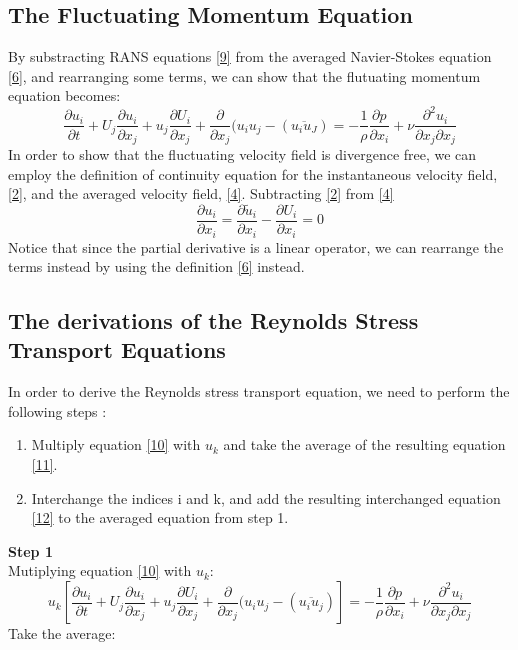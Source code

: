 \documentclass[11pt]{article}
\begin{document}
{%
\subsection{The Fluctuating Momentum Equation}

By substracting RANS equations \eqref{9} from the averaged Navier-Stokes equation
\eqref{6}, and rearranging some terms, we can show that the flutuating momentum
equation becomes: 
\begin{equation}
\label{10}
\frac{\partial u_{i}}{\partial t}+U_{j}\frac{\partial u_{i}}{\partial x_{j}}+u_{j}\frac{\partial U_{i}}{\partial x_{j}}+\frac{\partial}{\partial x_{j}}(u_{i}u_{j}-(\overline{u_{i}u_{J}})
=-\frac{1}{\rho}\frac{\partial p}{\partial x_{i}}+\nu\frac{\partial^{2}u_{i}}{\partial x_{j}\partial x_{j}}
\end{equation}
In order to show that the fluctuating velocity field is divergence free,
we can employ the definition of continuity equation for the instantaneous
velocity field, \eqref{2}, and the averaged velocity field, \eqref{4}. Subtracting
\eqref{2} from \eqref{4}
\begin{equation}
\label{11}
\frac{\partial u_{i}}{\partial x_{i}}=\frac{\partial\tilde{u}_{i}}{\partial x_{i}}-\frac{\partial U_{i}}{\partial x_{i}}=0
\end{equation}
Notice that since the partial derivative is a linear operator, we can rearrange 
the terms instead by using the definition \eqref{6} instead.


\subsection{The derivations of the Reynolds Stress Transport Equations}

In order to derive the Reynolds stress transport equation, we need
to perform the following steps :
\begin{enumerate}
\item Multiply equation \eqref{10} with $u_k$ and take the average of the resulting
equation \eqref{11}.
\item Interchange the indices i and k, and add the resulting interchanged
equation \eqref{12} to the averaged equation from step 1.
\end{enumerate}

\vspace{5mm}\hspace{-5mm}\textbf{Step 1} \\
Mutiplying equation \eqref{10} with $u_{k}$:
\[
u_{k}\left[\frac{\partial u_{i}}{\partial t}+U_{j}\frac{\partial u_{i}}{\partial x_{j}}+u_{j}\frac{\partial U_{i}}{\partial x_{j}}+\frac{\partial}{\partial x_{j}}(u_{i}u_{j}-(\overline{u_{i}u_{j}})\right]
=-\frac{1}{\rho}\frac{\partial p}{\partial x_{i}}+\nu\frac{\partial^{2}u_{i}}{\partial x_{j}\partial x_{j}}
\]
Take the average:

}
\end{document}
